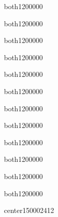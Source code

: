 \begin{WordParagraph}{both}{12}{}{0}{0}{0}{0}{0}
\WordAutoSpaceOn
\WordEmpty
\end{WordParagraph}

\begin{WordParagraph}{both}{12}{}{0}{0}{0}{0}{0}
\WordAutoSpaceOn
\WordEmpty
\end{WordParagraph}

\begin{WordParagraph}{both}{12}{}{0}{0}{0}{0}{0}
\WordAutoSpaceOn
\WordEmpty
\end{WordParagraph}

\begin{WordParagraph}{both}{12}{}{0}{0}{0}{0}{0}
\WordAutoSpaceOn
\WordEmpty
\end{WordParagraph}

\begin{WordParagraph}{both}{12}{}{0}{0}{0}{0}{0}
\WordAutoSpaceOn
\WordEmpty
\end{WordParagraph}

\begin{WordParagraph}{both}{12}{}{0}{0}{0}{0}{0}
\WordAutoSpaceOn
\WordEmpty
\end{WordParagraph}

\begin{WordParagraph}{both}{12}{}{0}{0}{0}{0}{0}
\WordAutoSpaceOn
\WordEmpty
\end{WordParagraph}

\begin{WordParagraph}{both}{12}{}{0}{0}{0}{0}{0}
\WordAutoSpaceOn
\WordEmpty
\end{WordParagraph}

\begin{WordParagraph}{both}{12}{}{0}{0}{0}{0}{0}
\WordAutoSpaceOn
\WordEmpty
\end{WordParagraph}

\begin{WordParagraph}{both}{12}{}{0}{0}{0}{0}{0}
\WordAutoSpaceOn
\WordEmpty
\end{WordParagraph}

\begin{WordParagraph}{both}{12}{}{0}{0}{0}{0}{0}
\WordAutoSpaceOn
\WordEmpty
\end{WordParagraph}

\begin{WordParagraph}{both}{12}{}{0}{0}{0}{0}{0}
\WordAutoSpaceOn
\WordEmpty
\end{WordParagraph}

\begin{WordParagraph}{center}{15}{}{0}{0}{0}{24}{12}
\WordAutoSpaceOn
\WordEmpty
\end{WordParagraph}
